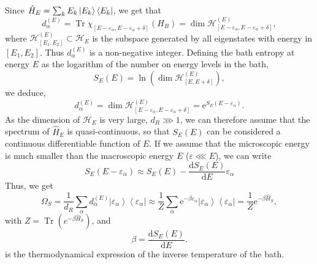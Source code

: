 Since $\hat{H}_{E}=\sum_{k} E_k\mathinner{|{E_k}\rangle}\mathinner{\langle{E_k}|}$, we get that
\begin{equation}
d_{\alpha}^{(E)}=\operatorname{Tr} \chi_{\left[E-\varepsilon_{\alpha}, E-\varepsilon_{\alpha}+\delta\right]}\left(H_{B}\right)=\operatorname{dim} \mathcal{H}_{\left[E-\varepsilon_{\alpha}, E-\varepsilon_{\alpha}+\delta\right]}^{(E)},
\label{CH1:equiprobable_canonical_4}
\end{equation}
where $\mathcal{H}^{(E)}_{[E_1,E_2]}\subset \mathcal{H}_{E}$ is the subspace generated by all eigenstates with energy in $[E_1,E_2]$. Thus $d^{(E)}_{\alpha}$ is a non-negative integer.
\newline
Defining the bath entropy at energy $E$ as the logarithm of the number on energy levels in the bath,
\begin{equation}
S_{E}(E)=\ln \left(\operatorname{dim} \mathcal{H}_{[E, E+\delta]}^{(E)}\right),
\label{CH1:equiprobable_canonical_5}
\end{equation}
we deduce,
\begin{equation}
d_{\alpha}^{(E)}=\operatorname{dim} \mathcal{H}_{\left[E-\varepsilon_{\alpha}, E-\varepsilon_{\alpha}+\delta\right]}^{(E)}=\mathrm{e}^{S_{E}\left(E-\varepsilon_{\alpha}\right)}.
\label{CH1:equiprobable_canonical_6}
\end{equation}
As the dimension of $\mathcal{H}_{E}$ is very large, $d_R\ggg 1$, we can therefore assume that the spectrum of $\hat{H}_E$ is quasi-continuous, so that $S_E (E)$ can be considered a continuous differentiable function of $E$. If we assume that the microscopic energy is much smaller than the macroscopic energy $E$ ($\varepsilon\lll E$), we can write
\begin{equation}
S_{E}\left(E-\varepsilon_{\alpha}\right) \approx S_{E}(E)-\frac{\mathrm{d} S_{E}(E)}{\mathrm{d} E} \varepsilon_{\alpha}
\label{CH1:equiprobable_canonical_7}
\end{equation}
Thus, we get
\begin{equation}
\Omega_{S}=
\frac{1}{d_{R}} \sum_{\alpha} d_{\alpha}^{(E)}\left|\varepsilon_{\alpha}\right\rangle\left\langle\varepsilon_{\alpha}\right|
\approx \frac{1}{Z} \sum_{\alpha} \mathrm{e}^{-\beta \varepsilon_{\alpha}}\left| \varepsilon_{\alpha}\right\rangle\left\langle\varepsilon_{\alpha}\right|
=\frac{1}{Z} \mathrm{e}^{-\beta \hat{H}_{S}},
\label{CH1:equiprobable_canonical_8}
\end{equation}
with $Z=\operatorname{Tr}\left(e^{-\beta\hat{H}_S}\right)$, and 
\begin{equation}
\beta=\frac{\mathrm{d} S_{E}(E)}{\mathrm{d} E}.
\end{equation}
is the thermodynamical expression of the inverse temperature of the bath.
